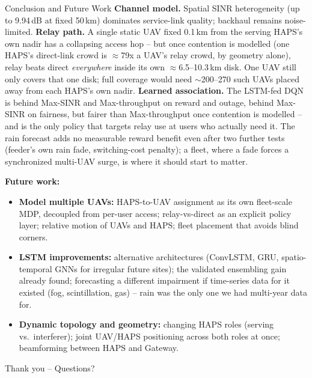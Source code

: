 \documentclass[aspectratio=169]{beamer}
\begin{document}
\begin{frame}{Conclusion and Future Work}
\scriptsize
\textbf{Channel model.} Spatial SINR heterogeneity (up to 9.94\,dB at
fixed 50\,km) dominates service-link quality; backhaul remains
noise-limited. \quad
\textbf{Relay path.} A single static UAV fixed 0.1\,km from the serving
HAPS's own nadir has a collapsing access hop -- but once contention is
modelled (one HAPS's direct-link crowd is $\approx$79x a UAV's relay
crowd, by geometry alone), relay beats direct \emph{everywhere} inside
its own $\approx$6.5--10.3\,km disk. One UAV still only covers that
one disk; full coverage would need $\sim$200--270 such UAVs placed
away from each HAPS's own nadir. \quad
\textbf{Learned association.} The LSTM-fed DQN is behind Max-SINR and
Max-throughput on reward and outage, behind Max-SINR on fairness, but
fairer than Max-throughput once contention is modelled -- and is the
only policy that targets relay use at users who actually need it. The
rain forecast adds no measurable reward benefit even after two further
tests (feeder's own rain fade, switching-cost penalty); a fleet, where
a fade forces a synchronized multi-UAV surge, is where it should start
to matter.

\vspace{2mm}
\textbf{Future work:}
\begin{itemize}\setlength{\itemsep}{0pt}
  \item \textbf{Model multiple UAVs:} HAPS-to-UAV assignment as its own
        fleet-scale MDP, decoupled from per-user access; relay-vs-direct
        as an explicit policy layer; relative motion of UAVs and HAPS;
        fleet placement that avoids blind corners.
  \item \textbf{LSTM improvements:} alternative architectures (ConvLSTM,
        GRU, spatio-temporal GNNs for irregular future sites); the
        validated ensembling gain already found; forecasting a
        different impairment if time-series data for it existed (fog,
        scintillation, gas) -- rain was the only one we had multi-year
        data for.
  \item \textbf{Dynamic topology and geometry:} changing HAPS roles
        (serving vs.\ interferer); joint UAV/HAPS positioning across
        both roles at once; beamforming between HAPS and Gateway.
\end{itemize}

\vspace{2mm}
\centering \large Thank you -- Questions?
\end{frame}
\end{document}

